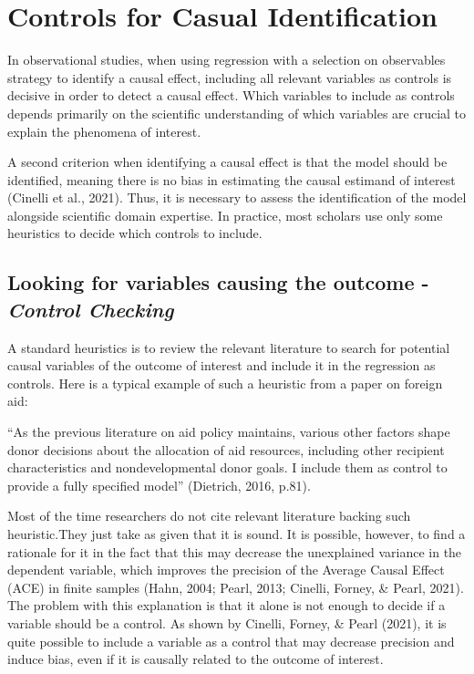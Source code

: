 \documentclass[
  super,
  preprint,
  3p]{elsarticle}
\begin{document}
\hypertarget{controls-for-casual-identification}{%
\section{Controls for Casual
Identification}\label{controls-for-casual-identification}}

In observational studies, when using regression with a selection on
observables strategy to identify a causal effect, including all relevant
variables as controls is decisive in order to detect a causal effect.
Which variables to include as controls depends primarily on the
scientific understanding of which variables are crucial to explain the
phenomena of interest.

A second criterion when identifying a causal effect is that the model
should be identified, meaning there is no bias in estimating the causal
estimand of interest (Cinelli et al., 2021). Thus, it is necessary to
assess the identification of the model alongside scientific domain
expertise. In practice, most scholars use only some heuristics to decide
which controls to include.

\hypertarget{looking-for-variables-causing-the-outcome---control-checking}{%
\subsection{\texorpdfstring{Looking for variables causing the outcome -
\emph{Control
Checking}}{Looking for variables causing the outcome - Control Checking}}\label{looking-for-variables-causing-the-outcome---control-checking}}

A standard heuristics is to review the relevant literature to search for
potential causal variables of the outcome of interest and include it in
the regression as controls. Here is a typical example of such a
heuristic from a paper on foreign aid:

``As the previous literature on aid policy maintains, various other
factors shape donor decisions about the allocation of aid resources,
including other recipient characteristics and nondevelopmental donor
goals. I include them as control to provide a fully specified model''
(Dietrich, 2016, p.81).

Most of the time researchers do not cite relevant literature backing
such heuristic.They just take as given that it is sound. It is possible,
however, to find a rationale for it in the fact that this may decrease
the unexplained variance in the dependent variable, which improves the
precision of the Average Causal Effect (ACE) in finite samples (Hahn,
2004; Pearl, 2013; Cinelli, Forney, \& Pearl, 2021). The problem with
this explanation is that it alone is not enough to decide if a variable
should be a control. As shown by Cinelli, Forney, \& Pearl (2021), it is
quite possible to include a variable as a control that may decrease
precision and induce bias, even if it is causally related to the outcome
of interest.
\end{document}
